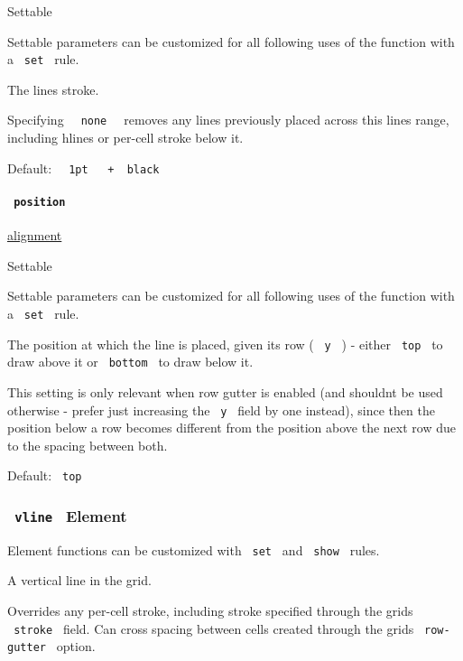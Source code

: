 {{ Settable }}

\label{definitions-hline-stroke-settable-tooltip}
Settable parameters can be customized for all following uses of the
function with a \texttt{\ set\ } rule.

The line\textquotesingle s stroke.

Specifying \texttt{\ }{\texttt{\ none\ }}\texttt{\ } removes any lines
previously placed across this line\textquotesingle s range, including
hlines or per-cell stroke below it.

Default:
\texttt{\ }{\texttt{\ 1pt\ }}\texttt{\ }{\texttt{\ +\ }}\texttt{\ black\ }

\paragraph{\texorpdfstring{\texttt{\ position\ }}{ position }}\label{definitions-hline-position}

\href{/docs/reference/layout/alignment/}{alignment}

{{ Settable }}

\label{definitions-hline-position-settable-tooltip}
Settable parameters can be customized for all following uses of the
function with a \texttt{\ set\ } rule.

The position at which the line is placed, given its row ( \texttt{\ y\ }
) - either \texttt{\ top\ } to draw above it or \texttt{\ bottom\ } to
draw below it.

This setting is only relevant when row gutter is enabled (and
shouldn\textquotesingle t be used otherwise - prefer just increasing the
\texttt{\ y\ } field by one instead), since then the position below a
row becomes different from the position above the next row due to the
spacing between both.

Default: \texttt{\ top\ }

\subsubsection{\texorpdfstring{\texttt{\ vline\ } {{ Element
}}}{ vline   Element }}\label{definitions-vline}

\label{definitions-vline-element-tooltip}
Element functions can be customized with \texttt{\ set\ } and
\texttt{\ show\ } rules.

A vertical line in the grid.

Overrides any per-cell stroke, including stroke specified through the
grid\textquotesingle s \texttt{\ stroke\ } field. Can cross spacing
between cells created through the grid\textquotesingle s
\texttt{\ row-gutter\ } option.

